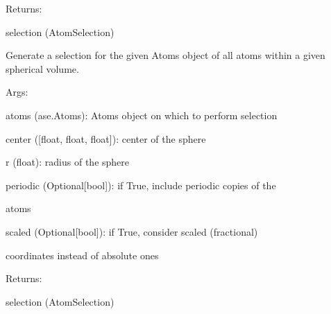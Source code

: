 \documentclass[letterpaper,10pt,english]{sphinxmanual}
\begin{document}
\begin{fulllineitems}
\begin{fulllineitems}
\begin{DUlineblock}{0em}
\item[] Returns:
\item[]
\begin{DUlineblock}{\DUlineblockindent}
\item[] selection (AtomSelection)
\end{DUlineblock}
\end{DUlineblock}

\end{fulllineitems}


\begin{fulllineitems}
\label{doctree/soprano.selection:soprano.selection.AtomSelection.from_sphere}
Generate a selection for the given Atoms object of all atoms within
a given spherical volume.

\begin{DUlineblock}{0em}
\item[] Args:
\item[]
\begin{DUlineblock}{\DUlineblockindent}
\item[] atoms (ase.Atoms): Atoms object on which to perform selection
\item[] center ({[}float, float, float{]}): center of the sphere
\item[] r (float): radius of the sphere
\item[] periodic (Optional{[}bool{]}): if True, include periodic copies of the
\item[]
\begin{DUlineblock}{\DUlineblockindent}
\item[] atoms
\end{DUlineblock}
\item[] scaled (Optional{[}bool{]}): if True, consider scaled (fractional)
\item[]
\begin{DUlineblock}{\DUlineblockindent}
\item[] coordinates instead of absolute ones
\end{DUlineblock}
\end{DUlineblock}
\end{DUlineblock}

\begin{DUlineblock}{0em}
\item[] Returns:
\item[]
\begin{DUlineblock}{\DUlineblockindent}
\item[] selection (AtomSelection)
\end{DUlineblock}
\end{DUlineblock}


\end{fulllineitems}
\end{fulllineitems}
\end{document}
